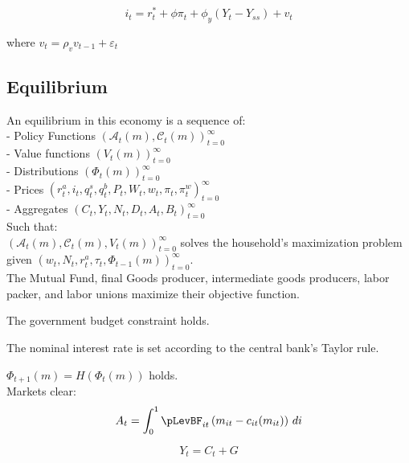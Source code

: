 \documentclass[titlepage]{\econtex}\providecommand{\texname}{BufferStockTheory}
\begin{document}
$$i_{t} = r_{t}^{*} +\phi \pi_{t} + \phi_{y} (Y_{t} - Y_{ss}) + v_{t}$$

where $v_{t} = \rho_{v} v_{t-1} +\varepsilon_{t}$


\hypertarget{Equilibrium}{}
\subsection{Equilibrium}


An equilibrium in this economy is a sequence of: \\

- Policy Functions $\left( \mathcal{A}_{t}(m) , \mathcal{C}_{t}(m) \right )_{t=0}^{\infty}$ \\

- Value functions $ \left( V_{t}(m) \right)_{t=0}^{\infty}$\\

- Distributions $ \left(\Phi_{t}(m) \right)_{t=0}^{\infty}$\\

- Prices $ \left( r^{a}_{t}, i_{t}, q^{s}_{t}, q^{b}_{t}, P_{t}, W_{t} , w_{t} , \pi_{t}, \pi^{w}_{t} \right) _{t=0}^{\infty}$\\

- Aggregates $ \left(C_{t}, Y_{t} , N_{t},D_{t} , A_{t} , B_{t} \right)_{t=0}^{\infty}$\\

Such that: \\

$ \left( \mathcal{A}_{t}(m) , \mathcal{C}_{t}(m), V_{t}(m)\right)_{t=0}^{\infty}$  solves the household's maximization problem given $  \left( w_{t}, N_{t},  r^{a}_{t}, \tau_{t}, \Phi_{t-1}(m)\right)_{t=0}^{\infty}$.\\

The Mutual Fund, final Goods producer, intermediate goods producers, labor packer, and labor unions maximize their objective function.

The government budget constraint holds.

The nominal interest rate is set according to the central bank's Taylor rule.


$ \Phi_{t+1}(m) = H(\Phi_{t}(m))$ holds.\\


Markets clear:\\

 $$ A_t =  \int_{0}^{1} \pLevBF_{it}\left( m_{it} - c_{it}(m_{it})\right) \, di $$
 
 $$ Y_t = C_{t} +G $$
 
\end{document}
